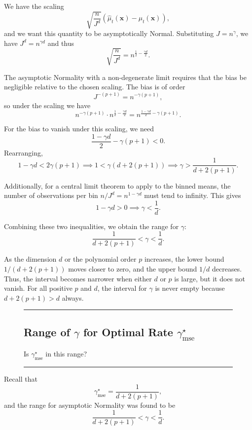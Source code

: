 \documentclass{article}
\newenvironment{colorparagraph}[1]{\par\color{#1}}{\par}
\begin{document}
We have the scaling
\[
\sqrt{\frac{n}{J^d}} (\hat{\mu}_t(\mathbf{x}) - \mu_t(\mathbf{x})),
\]
and we want this quantity to be asymptotically Normal. Substituting \( J = n^\gamma \), we have \( J^d = n^{\gamma d} \) and thus
\[
\sqrt{\frac{n}{J^d}} = n^{\frac{1}{2}-\frac{\gamma d}{2}}.
\]

The asymptotic Normality with a non-degenerate limit requires that the bias be negligible relative to the chosen scaling. The bias is of order
\[
J^{-(p+1)} = n^{-\gamma(p+1)},
\]
so under the scaling we have
\[
n^{-\gamma(p+1)} \cdot n^{\frac{1}{2}-\frac{\gamma d}{2}} = n^{\frac{1-\gamma d}{2} - \gamma(p+1)}.
\]

For the bias to vanish under this scaling, we need
\[
\frac{1-\gamma d}{2} - \gamma(p+1) < 0.
\]
Rearranging,
\[
1 - \gamma d < 2\gamma (p+1) \implies 1 < \gamma(d+2(p+1)) \implies \gamma > \frac{1}{d+2(p+1)}.
\]

Additionally, for a central limit theorem to apply to the binned means, the number of observations per bin \( n/J^d = n^{1-\gamma d} \) must tend to infinity. This gives
\[
1-\gamma d > 0 \implies \gamma < \frac{1}{d}.
\]

Combining these two inequalities, we obtain the range for \(\gamma\):
\[
\frac{1}{d+2(p+1)} < \gamma < \frac{1}{d}.
\]

As the dimension \( d \) or the polynomial order \( p \) increases, the lower bound \( 1/(d+2(p+1)) \) moves closer to zero, and the upper bound \( 1/d \) decreases. Thus, the interval becomes narrower when either \( d \) or \( p \) is large, but it does not vanish. For all positive \( p \) and \( d \), the interval for \(\gamma\) is never empty because \( d+2(p+1) > d \) always.

\begin{figure}[H]
  \begin{colorparagraph}{questioncolor}
  \rule{\textwidth}{0.5pt}
  \label{q1f}
  \subsection{Range of \(\gamma\) for Optimal Rate \(\gamma^\star_{\text{mse}}\)}

  Is \( \gamma^\star_{\text{mse}} \) in this range?

  \rule{\textwidth}{0.5pt}
  \end{colorparagraph}
\end{figure}

Recall that 
\[
\gamma^\star_{\text{mse}} = \frac{1}{d+2(p+1)},
\]
and the range for asymptotic Normality was found to be
\[
\frac{1}{d+2(p+1)} < \gamma < \frac{1}{d}.
\]
\end{document}
